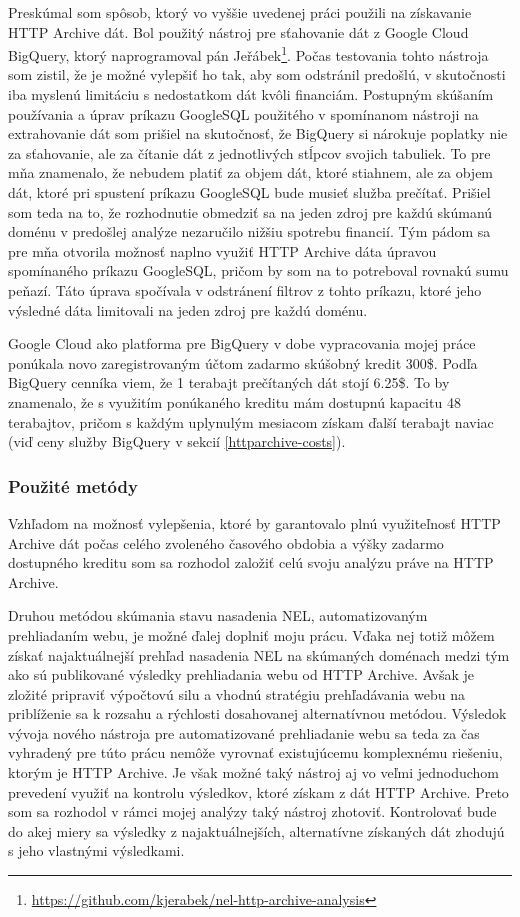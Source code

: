 Preskúmal som spôsob, ktorý vo vyššie uvedenej práci použili na získavanie HTTP Archive dát.
Bol použitý nástroj pre sťahovanie dát z Google Cloud BigQuery, ktorý naprogramoval pán 
Jeřábek\footnote{\href{https://github.com/kjerabek/nel-http-archive-analysis}{https://github.com/kjerabek/nel-http-archive-analysis}}.
Počas testovania tohto nástroja som zistil, že je možné vylepšiť ho tak, aby som odstránil predošlú, v skutočnosti iba myslenú limitáciu s nedostatkom dát kvôli financiám.
Postupným skúšaním používania a úprav príkazu GoogleSQL použitého v spomínanom nástroji na extrahovanie dát som prišiel na skutočnosť, že BigQuery
si nárokuje poplatky nie za sťahovanie, ale za čítanie dát z jednotlivých stĺpcov svojich tabuliek.
To pre mňa znamenalo, že nebudem platiť za objem dát, ktoré stiahnem, ale za objem dát, ktoré pri spustení príkazu GoogleSQL bude musieť služba prečítať.
Prišiel som teda na to, že rozhodnutie obmedziť sa na jeden zdroj pre každú skúmanú doménu v predošlej analýze nezaručilo nižšiu spotrebu financií.
Tým pádom sa pre mňa otvorila možnosť naplno využiť HTTP Archive dáta úpravou spomínaného príkazu GoogleSQL, pričom by som na to potreboval rovnakú sumu peňazí.
Táto úprava spočívala v odstránení filtrov z tohto príkazu, ktoré jeho výsledné dáta limitovali na jeden zdroj pre každú doménu.

Google Cloud ako platforma pre BigQuery v dobe vypracovania mojej práce ponúkala novo zaregistrovaným účtom zadarmo skúšobný
kredit 300\$. 
Podľa BigQuery cenníka viem, že 1 terabajt prečítaných dát stojí 6.25\$.
To by znamenalo, že s využitím ponúkaného kreditu mám dostupnú kapacitu 48 terabajtov, 
pričom s každým uplynulým mesiacom získam ďalší terabajt naviac (viď ceny služby BigQuery v sekcií \ref{httparchive-costs}).

\subsubsection{Použité metódy}

Vzhľadom na možnosť vylepšenia, ktoré by garantovalo plnú využiteľnosť HTTP Archive dát počas celého zvoleného časového obdobia a výšky zadarmo dostupného kreditu
som sa rozhodol založiť celú svoju analýzu práve na HTTP Archive.

Druhou metódou skúmania stavu nasadenia NEL, automatizovaným prehliadaním webu, je možné ďalej doplniť moju prácu.
Vďaka nej totiž môžem získať najaktuálnejší prehľad nasadenia NEL na skúmaných doménach medzi tým ako sú publikované výsledky prehliadania webu od HTTP Archive.
Avšak je zložité pripraviť výpočtovú silu a vhodnú stratégiu prehľadávania webu na priblíženie sa k rozsahu a rýchlosti dosahovanej alternatívnou metódou.
Výsledok vývoja nového nástroja pre automatizované prehliadanie webu sa teda za čas vyhradený pre túto prácu nemôže vyrovnať existujúcemu komplexnému riešeniu, ktorým je HTTP Archive.
Je však možné taký nástroj aj vo veľmi jednoduchom prevedení využiť na kontrolu výsledkov, ktoré získam z dát HTTP Archive.
Preto som sa rozhodol v rámci mojej analýzy taký nástroj zhotoviť.
Kontrolovať bude do akej miery sa výsledky z najaktuálnejších, alternatívne získaných dát zhodujú s jeho vlastnými výsledkami.

